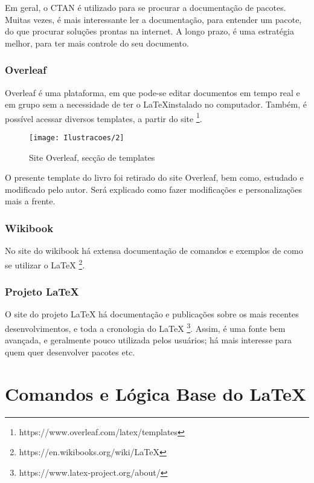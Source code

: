 \documentclass[12pt, brazilian, a5paper]{abntex2} %
\begin{document}
Em geral, o CTAN é utilizado para se procurar a documentação de
pacotes. Muitas vezes, é mais interessante ler a documentação, para
entender um pacote, do que
procurar soluções prontas na internet. A longo prazo, é uma estratégia
melhor, para ter mais controle do seu documento.

\clearpage

\subsection{Overleaf}

Overleaf é uma plataforma, em que pode-se editar documentos em tempo
real e em grupo sem a necessidade de ter o \LaTeX instalado no
computador. Também, é possível acessar diversos templates, a partir do
site \footnote{https://www.overleaf.com/latex/templates}.

\begin{figure}[!htb]
  \caption{\label{site_overleaf} Site Overleaf, secção de templates}
  \begin{center}
    \texttt{[image: Ilustracoes/2]}
  \end{center}
\end{figure}

O presente template do livro foi retirado do site Overleaf, bem como, estudado e
modificado pelo autor. Será explicado como fazer modificações e
personalizações mais a frente.

\subsection{Wikibook}

No site do wikibook há extensa documentação de comandos e exemplos de
como se utilizar o LaTeX
\footnote{https://en.wikibooks.org/wiki/LaTeX}.

\subsection{Projeto LaTeX}

O site do projeto LaTeX há documentação e publicações sobre os mais
recentes desenvolvimentos, e toda a cronologia do LaTeX
\footnote{https://www.latex-project.org/about/}. Assim, é uma fonte
bem avançada, e geralmente pouco utilizada pelos usuários; há mais
interesse para quem quer desenvolver pacotes etc.


\chapter{Comandos e Lógica Base do LaTeX}
\end{document}
